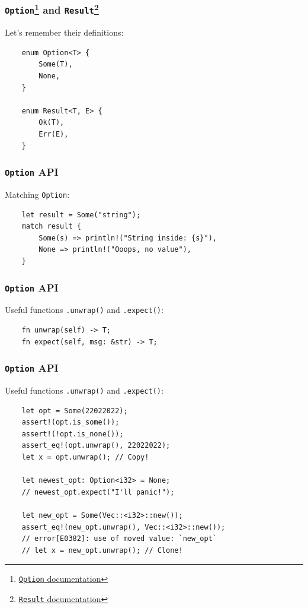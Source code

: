 \documentclass[aspectratio=1610,t]{beamer}
\begin{document}

\begin{frame}[fragile]
\frametitle{\texttt{Option}\footnote{\href{https://doc.rust-lang.org/std/option/enum.Option.html}{\texttt{Option} documentation}} and \texttt{Result}\footnote{\href{https://doc.rust-lang.org/std/result/enum.Result.html}{\texttt{Result} documentation}}}
Let's remember their definitions:

\begin{verbatim}
    enum Option<T> { 
        Some(T),
        None,
    }

    enum Result<T, E> {
        Ok(T),
        Err(E),
    }
\end{verbatim}
\end{frame}


\begin{frame}[fragile]
\frametitle{\texttt{Option} API}
Matching \texttt{Option}:

\begin{verbatim}
    let result = Some("string");
    match result {
        Some(s) => println!("String inside: {s}"),
        None => println!("Ooops, no value"),
    }
\end{verbatim}
\end{frame}


\begin{frame}[fragile]
\frametitle{\texttt{Option} API}
Useful functions \texttt{.unwrap()} and \texttt{.expect()}:

\begin{verbatim}
    fn unwrap(self) -> T;
    fn expect(self, msg: &str) -> T;
\end{verbatim}
\end{frame}


\begin{frame}[fragile]
\frametitle{\texttt{Option} API}
Useful functions \texttt{.unwrap()} and \texttt{.expect()}:

\begin{verbatim}
    let opt = Some(22022022);
    assert!(opt.is_some());
    assert!(!opt.is_none());
    assert_eq!(opt.unwrap(), 22022022);
    let x = opt.unwrap(); // Copy!

    let newest_opt: Option<i32> = None;
    // newest_opt.expect("I'll panic!");

    let new_opt = Some(Vec::<i32>::new());
    assert_eq!(new_opt.unwrap(), Vec::<i32>::new());
    // error[E0382]: use of moved value: `new_opt`
    // let x = new_opt.unwrap(); // Clone!
\end{verbatim}
\end{frame}
 
\end{document}
